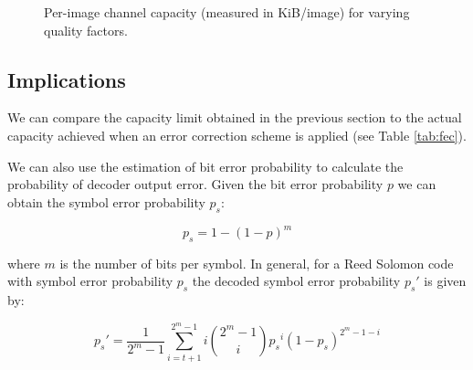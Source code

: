 \begin{figure}[tbph]
  \begin{center}
    \caption{Per-image channel capacity (measured in KiB/image) for varying quality factors.}
    \label{graph:capacity}
  \end{center}
\end{figure}

\subsection{Implications}

We can compare the capacity limit obtained in the previous section to the actual capacity achieved when an error correction scheme is applied (see Table \ref{tab:fec}).

We can also use the estimation of bit error probability to calculate the probability of decoder output error. Given the bit error probability $p$ we can obtain the symbol error probability $p_s$:

\begin{equation}
    p_s = 1 - (1-p)^m
\end{equation}

where $m$ is the number of bits per symbol. In general, for a Reed Solomon code with symbol error probability $p_s$ the decoded symbol error probability $p_s'$ is given by:

\begin{equation}
    p_s' = \frac{1}{2^m -1} \sum^{2^m - 1}_{i = t+1} i {{2^m - 1}\choose{i}} {p_s}^i (1-{p_s})^{2^m - 1 - i}
\end{equation}

